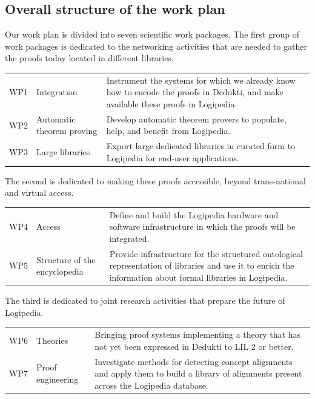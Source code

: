 \subsection{Overall structure of the work plan}

Our work plan is divided into seven scientific work packages.
The first group of work packages is dedicated to the networking
activities that are needed to gather the proofs today located in
different libraries.

\begin{longtable}{|p{}|p{}|p{}|}
\hline
\rowcolor{color2}\multicolumn{3}{|l|}{\bf Networking activities:}\\
\hline
WP1
&
Integration
&
Instrument the systems for which we already know how to encode the
proofs in Dedukti, and make available these proofs in Logipedia.
\\
\hline
WP2
&
Automatic theorem proving
& 
Develop automatic theorem provers to populate,
help, and benefit from Logipedia.
\\
\hline
WP3
&
Large libraries
&
Export large dedicated libraries in curated form 
to Logipedia for end-user applications.
\\
\hline
\end{longtable}

The second is dedicated to making these proofs accessible, beyond
trans-national and virtual access.

\begin{longtable}{|p{}|p{}|p{}|}
\hline
\rowcolor{color2}\multicolumn{3}{|l|}{\bf Trans-national and virtual access:}\\
\hline
WP4
&
Access
&
Define and build the Logipedia hardware and software infrastructure in
which the proofs will be integrated.
\\
\hline
WP5
&
Structure of the encyclopedia
&
Provide infrastructure for the structured ontological representation
of libraries and use it to enrich the information about formal
libraries in Logipedia.
\\
\hline
\end{longtable}

The third is dedicated to joint research activities that prepare
the future of Logipedia.

\begin{longtable}{|p{}|p{}|p{}|}
\hline
\rowcolor{color2}\multicolumn{3}{|l|}{\bf Joint research activities:}\\
\hline
WP6
&
Theories
&
Bringing proof systems implementing a theory 
that has not yet been expressed in Dedukti to LIL 2 or better.
\\
\hline
WP7
&
Proof engineering
&
Investigate methods for detecting concept alignments and apply
them to build a library of alignments present across the Logipedia database.
\\
\hline
\end{longtable}

